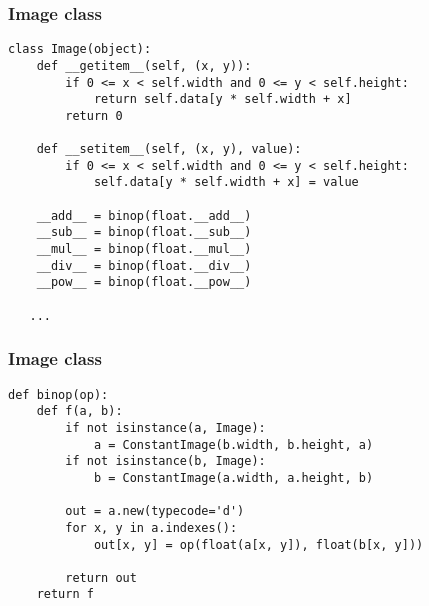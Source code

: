 \documentclass[utf8x]{beamer}
\begin{document}
\begin{frame}[fragile]
  \frametitle{Image class}
\begin{lstlisting}[mathescape,basicstyle=\setstretch{1.05}\ttfamily\scriptsize]
class Image(object):
    def __getitem__(self, (x, y)):
        if 0 <= x < self.width and 0 <= y < self.height:
            return self.data[y * self.width + x]
        return 0

    def __setitem__(self, (x, y), value):
        if 0 <= x < self.width and 0 <= y < self.height:
            self.data[y * self.width + x] = value

    __add__ = binop(float.__add__)
    __sub__ = binop(float.__sub__)
    __mul__ = binop(float.__mul__)
    __div__ = binop(float.__div__)
    __pow__ = binop(float.__pow__)

   ...
\end{lstlisting}
\end{frame}

\begin{frame}[fragile]
  \frametitle{Image class}
\begin{lstlisting}[mathescape,basicstyle=\setstretch{1.05}\ttfamily\scriptsize]
def binop(op):
    def f(a, b):
        if not isinstance(a, Image):
            a = ConstantImage(b.width, b.height, a)
        if not isinstance(b, Image):
            b = ConstantImage(a.width, a.height, b)

        out = a.new(typecode='d')
        for x, y in a.indexes():
            out[x, y] = op(float(a[x, y]), float(b[x, y]))

        return out
    return f
\end{lstlisting}
\end{frame}
\end{document}
